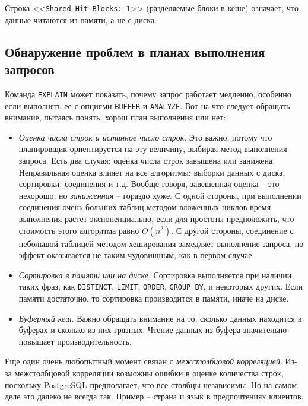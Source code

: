 \documentclass[%
	11pt,
	a4paper,
	utf8,
		]{article}
\begin{document}
Строка <<\texttt{Shared Hit Blocks: 1}>> (разделяемые блоки в кеше) означает, что данные читаются из памяти, а не с диска.

\subsection{Обнаружение проблем в планах выполнения запросов}

Команда \texttt{EXPLAIN} может показать, почему запрос работает медленно, особенно если выполнять ее с опциями \texttt{BUFFER} и \texttt{ANALYZE}. Вот на что следует обращать внимание, пытаясь понять, хорош план выполнения или нет:
\begin{itemize}
	\item \emph{Оценка числа строк и истинное число строк}. Это важно, потому что планировщик ориентируется на эту величину, выбирая метод выполнения запроса. Есть два случая: оценка числа строк завышена или занижена. Неправильная оценка влияет на все алгоритмы: выборки данных с диска, сортировки, соединения и т.д. Вообще говоря, завешенная оценка -- это нехорошо, но \emph{заниженная} -- гораздо хуже. С одной стороны, при выполнении соединения очень больших таблиц методом вложенных циклов время выполнения растет экспоненциально, если для простоты предположить, что стоимость этого алгоритма равно $ O(n^2) $. С другой стороны, соединение с небольшой таблицей методом хеширования замедляет выполнение запроса, но эффект оказывается не таким чудовищным, как в первом случае.
	
	\item \emph{Сортировка в памяти или на диске}. Сортировка выполняется при наличии таких фраз, как \texttt{DISTINCT}, \texttt{LIMIT}, \texttt{ORDER}, \texttt{GROUP BY}, и некоторых других. Если памяти достаточно, то сортировка производится в памяти, иначе на диске.
	
	\item \emph{Буферный кеш}. Важно обращать внимание на то, сколько данных находится в буферах и сколько из них грязных. Чтение данных из буфера значительно повышает производительность.
\end{itemize}


Еще один очень любопытный момент связан с \emph{межстолбцовой корреляцией}. Из-за межстолбцовой корреляции возможны ошибки в оценке количества строк, поскольку PostgreSQL предполагает, что все столбцы независимы. Но на самом деле это далеко не всегда так. Пример -- страна и язык в предпочтениях клиентов. 
\end{document}
